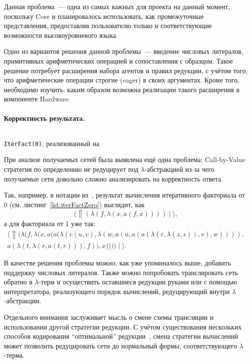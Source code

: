 Данная проблема~--- одна из самых важных для проекта на данный момент, поскольку Core и \INs{} планировалось использовать, как промежуточные представления, предоставляя пользователю только \LamagraphML{} и соответствующие возможности высокоуровневого языка.

Один из вариантов решения данной проблемы~--- введение числовых литералов, примитивных арифметических операцией и сопоставления с образцом.
Такое решение потребует расширения набора агентов и правил редукции, с учётом того, что арифметические операции строгие (eager) в своих аргументах.
Кроме того, необходимо изучить, каким образом возможна реализации такого расширения в компоненте Hardware.

\paragraph{Корректность результата.}
\begin{listing}
    \inputminted[fontsize=\footnotesize, breaklines]{ocaml}{figures/iterFactZero.lml}
    \caption{\texttt{IterFact(0)}, реализованный на \LamagraphML{}}
    \label{lst:iterFactZero}
\end{listing}
При анализе получаемых сетей была выявлена ещё одна проблема: Call-by-Value стратегия по определению не редуцирует под $\lambda$-абстракцией из-за чего получаемые сети довольно сложно анализировать на корректность ответа.

Так, например, в нотации из~\cite{fernandezCalculusInteractionNets1999}, результат вычисления итеративного факториала от 0 (см. листинг~\ref{lst:iterFactZero}) выглядит, как
\[\big\langle \Uparrow(\lambda(f, \lambda(x, a(f, x)))) \mid \big\rangle,\]
а для факториала от 1 уже так:
\begin{multline*}
    \big\langle \Uparrow(\lambda(f, \lambda(x, a(a(\lambda(c(u, v), \lambda(w, a(u, a(a(\lambda(\varepsilon, \lambda(z, z)), v), w)))), \\
    a(\lambda(t, \lambda(r, a(t, r))), f)), x)))) \mid \big\rangle.
\end{multline*}

В качестве решения проблемы можно, как уже упоминалось выше, добавить поддержку числовых литералов.
Также можно попробовать транслировать сеть обратно в $\lambda$-терм и осуществить оставшиеся редукции руками или с помощью интерпретатора, реализующего порядок вычислений, редуцирующий внутри $\lambda$-абстракции.

Отдельного внимания заслуживает мысль о смене схемы трансляции и использовании другой стратегии редукции.
С учётом существования нескольких способов кодирования \enquote{оптимальной} редукции~\cite{lampingAlgorithmOptimalLambda1990, aspertiBolognaOptimalHigherorder1996, gonthierGeometryOptimalLambda1992, vincentvanoostromLambdascopeAnotherOptimal2004}, смена стратегии вычислений может позволить редуцировать сети до нормальный формы, соответствующего $\lambda$-терма.

